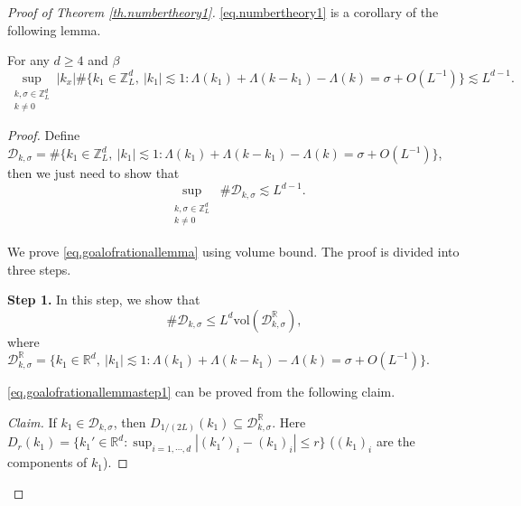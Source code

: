 \begin{proof}[Proof of Theorem \ref{th.numbertheory1}]\eqref{eq.numbertheory1} is a corollary of the following lemma. 

\begin{lem}\label{lem.rationallemma} For any $d\ge 4$ and $\beta$
\begin{equation}
    \sup_{\substack{k,\sigma\in\mathbb{Z}_L^d\\k\ne 0}} |k_x| \#\{k_1\in\mathbb{Z}^d_L,\ |k_1|\lesssim 1:\Lambda(k_1)+\Lambda(k-k_1)-\Lambda(k)=\sigma+O(L^{-1})\}\lesssim L^{d-1} .
\end{equation}
\end{lem}
\begin{proof}
Define $\mathcal{D}_{k,\sigma}=\#\{k_1\in\mathbb{Z}^d_L,\ |k_1|\lesssim 1:\Lambda(k_1)+\Lambda(k-k_1)-\Lambda(k)=\sigma+O(L^{-1})\}$, then we just need to show that 
\begin{equation}\label{eq.goalofrationallemma}
    \sup_{\substack{\substack{k,\sigma\in\mathbb{Z}_L^d\\k\ne 0}}} \#\mathcal{D}_{k,\sigma}\lesssim L^{d-1} .
\end{equation}

We prove \eqref{eq.goalofrationallemma} using volume bound. The proof is divided into three steps.





\textbf{Step 1.} In this step, we show that 
\begin{equation}\label{eq.goalofrationallemmastep1}
    \#\mathcal{D}_{k,\sigma}\le L^{d} \text{vol}(\mathcal{D}^{\mathbb{R}}_{k,\sigma}),
\end{equation}
where $\mathcal{D}^{\mathbb{R}}_{k,\sigma}=\{k_1\in \mathbb{R}^d,\ |k_1|\lesssim 1:\Lambda(k_1)+\Lambda(k-k_1)-\Lambda(k)=\sigma+O(L^{-1})\}$.

\eqref{eq.goalofrationallemmastep1} can be proved from the following claim.

\textit{Claim.} If $k_1\in \mathcal{D}_{k,\sigma}$, then $D_{1/(2L)}(k_1)\subseteq \mathcal{D}^{\mathbb{R}}_{k,\sigma}$. Here  $D_{r}(k_1)=\{k_1'\in \mathbb{R}^d: \sup_{i=1,\cdots, d} |(k_1')_i-(k_1)_i|\le r\}$ ($(k_1)_i$ are the components of $k_1$). 


\end{proof}
\end{proof}
